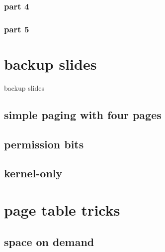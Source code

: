\subsubsection{part 4}

\subsubsection{part 5}



\section{backup slides}
\begin{frame}{backup slides}
\end{frame}

\subsection{simple paging with four pages}


\subsection{permission bits}


\subsection{kernel-only}


\section{page table tricks}
\subsection{space on demand}



